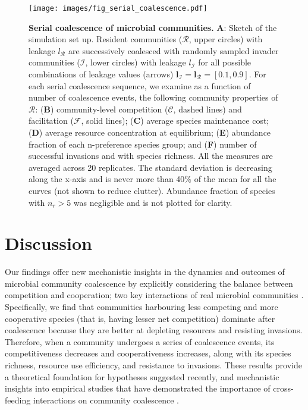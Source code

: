 \documentclass[10pt,letterpaper]{article}
\begin{document}
\begin{figure}[ht!]
\begin{adjustwidth}{-1.5in}{0in}
    \centering
    \texttt{[image: images/fig\_serial\_coalescence.pdf]}
    \vspace{15pt}
    \caption{\textbf{Serial coalescence of microbial communities.} \textbf{A}: Sketch of the simulation set up. Resident communities ($\mathcal{R}$, upper circles) with leakage $l_{\mathcal{R}}$ are successively coalesced with randomly sampled invader communities ($\mathcal{I}$, lower circles) with leakage $l_{\mathcal{I}}$ for all possible combinations of leakage values (arrows) $\boldsymbol{l}_{\mathcal{I}} = \boldsymbol{l}_{\mathcal{R}} = [0.1, 0.9]$. For each serial coalescence sequence, we examine as a function of number of coalescence events, the following community properties of $\mathcal{R}$: (\textbf{B}) community-level competition ($\mathcal{C}$, dashed lines) and facilitation ($\mathcal{F}$, solid lines); (\textbf{C}) average species maintenance cost; (\textbf{D}) average resource concentration at equilibrium; (\textbf{E}) abundance fraction of each n-preference species group; and (\textbf{F}) number of successful invasions and with species richness. All the measures are averaged across 20 replicates. The standard deviation is decreasing along the x-axis and is never more than 40\% of the mean for all the curves (not shown to reduce clutter). Abundance fraction of species with $n_r > 5$ was negligible and is not plotted for clarity.}
    \label{fig:serial_coalescence}
\end{adjustwidth}
\end{figure}

\section*{Discussion}

Our findings offer new mechanistic insights in the dynamics and outcomes of microbial community coalescence by explicitly considering the balance between competition and cooperation; two key interactions of real microbial communities \cite{Machado2021, Pascual-Garcia2020}. Specifically, we find that communities harbouring less competing and more cooperative species (that is, having lesser net competition) dominate after coalescence because they are better at depleting resources and resisting invasions. Therefore, when a community undergoes a series of coalescence events, its competitiveness decreases and cooperativeness increases, along with its species richness, resource use efficiency, and resistance to invasions. These results provide a theoretical foundation for hypotheses suggested recently\cite{Castledine2020, Rillig2015}, and mechanistic insights into empirical studies that have demonstrated the importance of cross-feeding interactions on community coalescence \cite{Sierocinski2017}.
\end{document}
